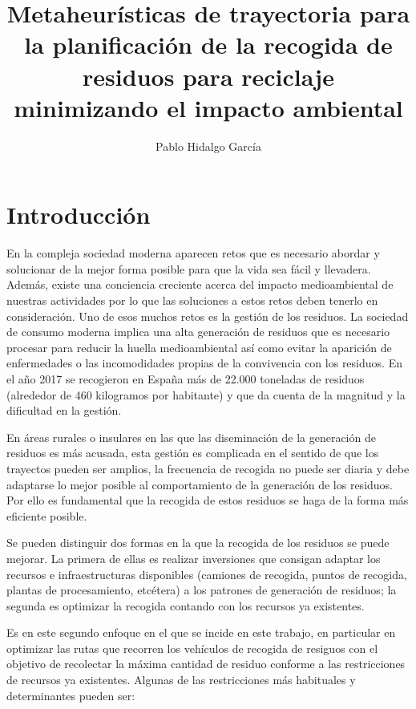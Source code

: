\documentclass[
]{article}
\title{Metaheurísticas de trayectoria para la planificación de la recogida de
residuos para reciclaje minimizando el impacto ambiental}
\author{Pablo Hidalgo García}
\date{}
\begin{document}
\maketitle

\hypertarget{introducciuxf3n}{%
\section{Introducción}\label{introducciuxf3n}}

En la compleja sociedad moderna aparecen retos que es necesario abordar
y solucionar de la mejor forma posible para que la vida sea fácil y
llevadera. Además, existe una conciencia creciente acerca del impacto
medioambiental de nuestras actividades por lo que las soluciones a estos
retos deben tenerlo en consideración. Uno de esos muchos retos es la
gestión de los residuos. La sociedad de consumo moderna implica una alta
generación de residuos que es necesario procesar para reducir la huella
medioambiental así como evitar la aparición de enfermedades o las
incomodidades propias de la convivencia con los residuos. En el año 2017
se recogieron en España más de 22.000 toneladas de residuos (alrededor
de 460 kilogramos por habitante) y que da cuenta de la magnitud y la
dificultad en la gestión.

En áreas rurales o insulares en las que las diseminación de la
generación de residuos es más acusada, esta gestión es complicada en el
sentido de que los trayectos pueden ser amplios, la frecuencia de
recogida no puede ser diaria y debe adaptarse lo mejor posible al
comportamiento de la generación de los residuos. Por ello es fundamental
que la recogida de estos residuos se haga de la forma más eficiente
posible.

Se pueden distinguir dos formas en la que la recogida de los residuos se
puede mejorar. La primera de ellas es realizar inversiones que consigan
adaptar los recursos e infraestructuras disponibles (camiones de
recogida, puntos de recogida, plantas de procesamiento, etcétera) a los
patrones de generación de residuos; la segunda es optimizar la recogida
contando con los recursos ya existentes.

Es en este segundo enfoque en el que se incide en este trabajo, en
particular en optimizar las rutas que recorren los vehículos de recogida
de resiguos con el objetivo de recolectar la máxima cantidad de residuo
conforme a las restricciones de recursos ya existentes. Algunas de las
restricciones más habituales y determinantes pueden ser:
\end{document}
